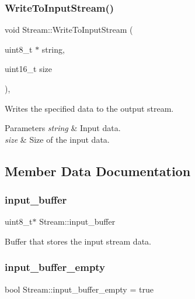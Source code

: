 \subsubsection{\texorpdfstring{Write\+To\+Input\+Stream()}{WriteToInputStream()}}
{\footnotesize\ttfamily void Stream\+::\+Write\+To\+Input\+Stream (\begin{DoxyParamCaption}\item[{uint8\+\_\+t $\ast$}]{string,  }\item[{uint16\+\_\+t}]{size }\end{DoxyParamCaption})\hspace{0.3cm}{\ttfamily [protected]}, {\ttfamily [virtual]}}

Writes the specified data to the output stream. 
\begin{DoxyParams}{Parameters}
{\em string} & Input data. \\
\hline
{\em size} & Size of the input data. \\
\hline
\end{DoxyParams}


\subsection{Member Data Documentation}
\hypertarget{class_stream_a81139fc126566f9d42470fdb405ed26a}{}\label{class_stream_a81139fc126566f9d42470fdb405ed26a} 
\subsubsection{\texorpdfstring{input\+\_\+buffer}{input\_buffer}}
{\footnotesize\ttfamily uint8\+\_\+t$\ast$ Stream\+::input\+\_\+buffer\hspace{0.3cm}{\ttfamily [protected]}}

Buffer that stores the input stream data. \hypertarget{class_stream_aff1c899af0d2dea35700d5665f378cd8}{}\label{class_stream_aff1c899af0d2dea35700d5665f378cd8} 
\subsubsection{\texorpdfstring{input\+\_\+buffer\+\_\+empty}{input\_buffer\_empty}}
{\footnotesize\ttfamily bool Stream\+::input\+\_\+buffer\+\_\+empty = true\hspace{0.3cm}{\ttfamily [protected]}}

